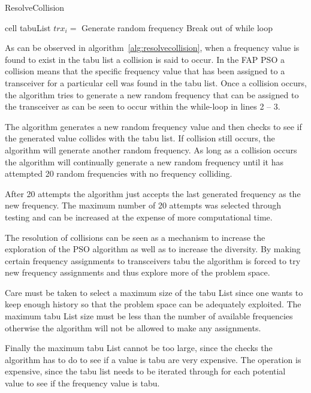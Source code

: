 \begin{algorithm}[H]
\caption{ResolveCollision}
\label{alg:resolvecollision}
\begin{algorithmic}[1]
	\Require cell
	\Require tabuList
				\State $trx_i = $ Generate random frequency
					\State Break out of while loop
				\EndIf
			\EndWhile
	\EndFor
\end{algorithmic}
\end{algorithm}

As can be observed in algorithm~\ref{alg:resolvecollision}, when a frequency value is found to exist in the tabu list a collision is said to occur. In the \gls{FAP} \gls{PSO} a collision means that the specific frequency value that has been assigned to a transceiver for a particular cell was found in the tabu list. Once a collision occurs, the algorithm tries to generate a new random frequency that can be assigned to the transceiver as can be seen to occur within the while-loop in lines 2 -- 3.

The algorithm generates a new random frequency value and then checks to see if the generated value collides with the tabu list. If collision still occurs, the algorithm will generate another random frequency. As long as a collision occurs the algorithm will continually generate a new random frequency until it has attempted 20 random frequencies with no frequency colliding. 

After 20 attempts the algorithm just accepts the last generated frequency as the new frequency. The maximum number of 20  attempts was selected through testing and can be increased at the expense of more computational time. 

The resolution of collisions can be seen as a mechanism to increase the exploration of the \gls{PSO} algorithm as well as to increase the diversity. By making certain frequency assignments to transceivers tabu the algorithm is forced to try new frequency assignments and thus explore more of the problem space.

Care must be taken to select a maximum size of the tabu List since one wants to keep enough history so that the problem space can be adequately exploited. The maximum tabu List size must be less than the number of available frequencies otherwise the algorithm will not be allowed to make any assignments. 

Finally the maximum tabu List cannot be too large, since the checks the algorithm has to do to see if a value is tabu are very expensive. The operation is expensive, since the tabu list needs to be iterated through for each potential value to see if the frequency value is tabu.

